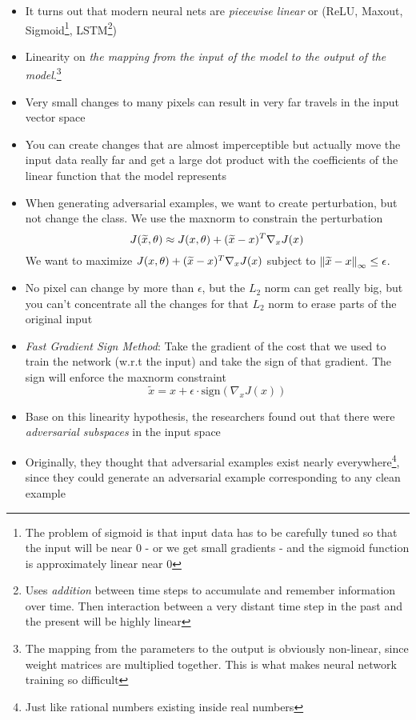 \begin{itemize}
\begin{itemize}
		\item It turns out that modern neural nets are \textit{piecewise linear} or (ReLU, Maxout, Sigmoid\footnote{The problem of sigmoid is that input data has to be carefully tuned so that the input will be near 0 - or we get small gradients - and the sigmoid function is approximately linear near 0}, LSTM\footnote{Uses \textit{addition} between time steps to accumulate and remember information over time. Then interaction between a very distant time step in the past and the present will be highly linear})
		\item Linearity on \textit{the mapping from the input of the model to the output of the model}.\footnote{The mapping from the parameters to the output is obviously non-linear, since weight matrices are multiplied together. This is what makes neural network training so difficult}
		\item Very small changes to many pixels can result in very far travels in the input vector space
		\item You can create changes that are almost imperceptible but actually move the input data really far and get a large dot product with the coefficients of the linear function that the model represents
		\item When generating adversarial examples, we want to create perturbation, but not change the class. We use the maxnorm to constrain the perturbation
		\begin{equation*}
			J(\widetilde{x}, \theta) \approx J(x, \theta) + (\widetilde{x} - x)^T \nabla_x J(x)
		\end{equation*}
		We want to maximize $J(x, \theta) + (\widetilde{x} - x)^T \nabla_x J(x)$ subject to $\left\lVert\widetilde{x} - x\right\rVert_\infty \leq \epsilon$.
		\item No pixel can change by more than $\epsilon$, but the $L_2$ norm can get really big, but you can't concentrate all the changes for that $L_2$ norm to erase parts of the original input
		\item \textit{Fast Gradient Sign Method}: Take the gradient of the cost that we used to train the network (w.r.t the input) and take the sign of that gradient. The sign will enforce the maxnorm constraint
		$$\widetilde{x} = x + \epsilon \cdot \textrm{sign}(\nabla_x J(x))$$
		\item Base on this linearity hypothesis, the researchers found out that there were \textit{adversarial subspaces} in the input space
		\item Originally, they thought that adversarial examples exist nearly everywhere\footnote{Just like rational numbers existing inside real numbers}, since they could generate an adversarial example corresponding to any clean example

\end{itemize}
\end{itemize}
